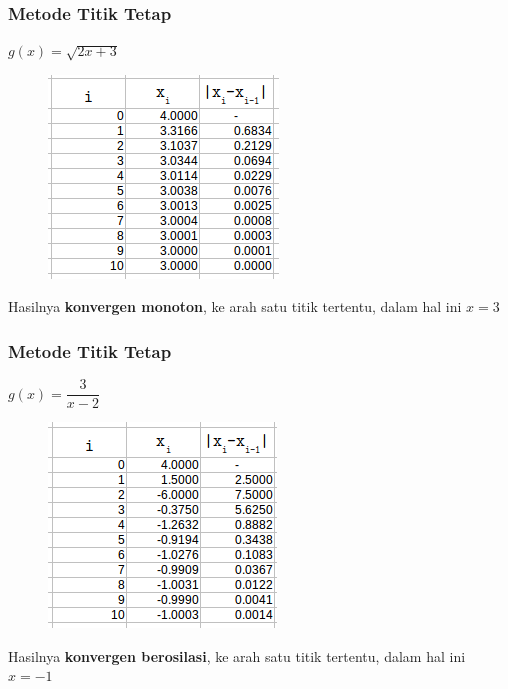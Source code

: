 \documentclass{beamer}
\begin{document}
\begin{frame}
\frametitle{Metode Titik Tetap}
$g(x) = \sqrt{2x+3}$
\begin{figure}[htp]
\centering
\includegraphics[scale=0.70]{TTver2.png}
\end{figure}
Hasilnya \textbf{konvergen monoton}, ke arah satu titik tertentu, dalam hal ini $x=3$
\end{frame}


\begin{frame}
\frametitle{Metode Titik Tetap}
$g(x) = \dfrac{3}{x-2}$
\begin{figure}[htp]
\centering
\includegraphics[scale=0.70]{TTver3.png}
\end{figure}
Hasilnya \textbf{konvergen berosilasi}, ke arah satu titik tertentu, dalam hal ini $x=-1$
\end{frame}

\end{document}
